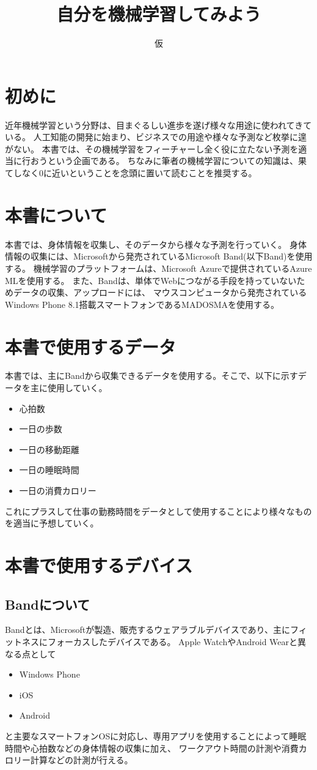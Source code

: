 \documentclass[10pt,a4j,twocolumn]{jarticle}
\title{自分を機械学習してみよう}
\author{仮}
\date{\hfill}
\begin{document}
	\maketitle
	\thispagestyle{empty}
	\section{初めに}
	近年機械学習という分野は、目まぐるしい進歩を遂げ様々な用途に使われてきている。
	人工知能の開発に始まり、ビジネスでの用途や様々な予測など枚挙に遑がない。
	本書では、その機械学習をフィーチャーし全く役に立たない予測を適当に行おうという企画である。
	ちなみに筆者の機械学習についての知識は、果てしなく0に近いということを念頭に置いて読むことを推奨する。

	\section{本書について}
	本書では、身体情報を収集し、そのデータから様々な予測を行っていく。
	身体情報の収集には、Microsoftから発売されているMicrosoft Band(以下Band)を使用する。
	機械学習のプラットフォームは、Microsoft Azureで提供されているAzure MLを使用する。
	また、Bandは、単体でWebにつながる手段を持っていないためデータの収集、アップロードには、
	マウスコンピュータから発売されているWindows Phone 8.1搭載スマートフォンであるMADOSMAを使用する。

	\section{本書で使用するデータ}
	本書では、主にBandから収集できるデータを使用する。そこで、以下に示すデータを主に使用していく。
	\begin{itemize}
		\item 心拍数
		\item 一日の歩数
		\item 一日の移動距離
		\item 一日の睡眠時間
		\item 一日の消費カロリー
	\end{itemize}
	これにプラスして仕事の勤務時間をデータとして使用することにより様々なものを適当に予想していく。

	\section{本書で使用するデバイス}

	\subsection{Bandについて}
	Bandとは、Microsoftが製造、販売するウェアラブルデバイスであり、主にフィットネスにフォーカスしたデバイスである。
	Apple WatchやAndroid Wearと異なる点として
	\begin{itemize}
		\item Windows Phone
		\item iOS
		\item Android
	\end{itemize}
	と主要なスマートフォンOSに対応し、専用アプリを使用することによって睡眠時間や心拍数などの身体情報の収集に加え、
	ワークアウト時間の計測や消費カロリー計算などの計測が行える。
\end{document}
